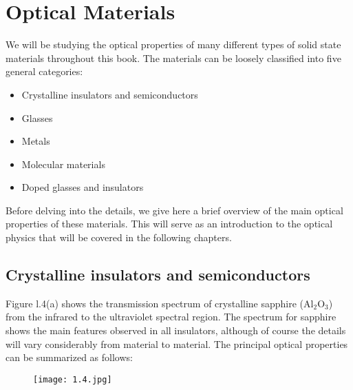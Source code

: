\documentclass[12pt]{book}
\begin{document}
\section{Optical Materials}

We will be studying the optical properties of many different types of solid state materials throughout this book. The materials can be loosely classified into five general categories:
\begin{itemize}
  \item Crystalline insulators and semiconductors
  \item Glasses
  \item Metals
  \item Molecular materials
  \item Doped glasses and insulators
\end{itemize}
Before delving into the details, we give here a brief overview of the main optical properties of these materials. This will serve as an introduction to the optical physics that will be covered in the following chapters.

\subsection{Crystalline insulators and semiconductors}

Figure l.4(a) shows the transmission spectrum of crystalline sapphire ($\mathrm{Al_2O_3}$) from the infrared to the ultraviolet spectral region. The spectrum for sapphire shows the main features observed in all insulators, although of course the details will vary considerably from material to material. The principal optical properties can be summarized as follows:
\begin{figure}[htbp]
\begin{center}
\texttt{[image: 1.4.jpg]}
\label{fig:1.4}
\end{center}
\end{figure}
\end{document}
